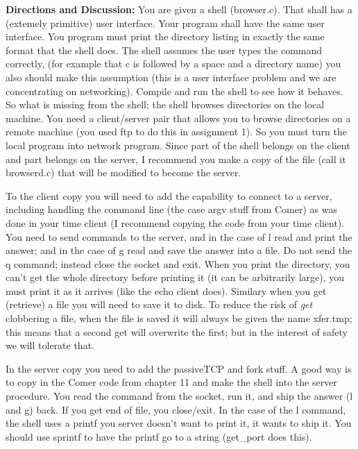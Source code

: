 {\bf Directions and Discussion:} 
You are given a shell ({\ltt{}browser.c}). 
That shall has a (extemely primitive) user interface.
Your program shall have the same user interface.
You program must print the directory listing in exactly the same
format that the shell does.
The shell assumes the user types the command correctly,
(for example that c is followed by a space and a directory name)
you also should make this assumption
(this is a user interface problem and we are concentrating on networking).
Compile and run the shell to see how it behaves.
So what is missing from the shell;
the shell browses directories on the local machine.
You need a client/server pair that allows you to browse directories on
a remote machine (you used ftp to do this in assignment 1).
So you must turn the local program into network program.
Since part of the shell belongs on the client and part belongs
on the server, I recommend you make a copy of the file
(call it {\ltt{}browserd.c}) that will be modified to become the server.

To the client copy you will need to add the 
capability to connect to a server, 
including handling the command line (the case argv stuff from Comer)
as was done in your time client
(I recommend copying the code from your time client).
You need to send commands to the server,
and in the case of {\ltt{}l} read and print the answer;
and in the case of {\ltt{}g} read and save the answer into a file.
Do not send the {\ltt{}q} command; instead close the socket and exit.
When you print the directory, you can't get the whole directory before 
printing it (it can be arbitrarily large), 
you must print it as it arrives (like the echo client does).
Similary when you get (retrieve) a file you will need to save it to disk.
To reduce the risk of {\it get} clobbering a file, when the file is
saved it will always be given the name {\ltt{}xfer.tmp}; this means
that a second get will overwrite the first; but in the interest of
safety we will tolerate that.

In the server copy you need to add the passiveTCP and fork stuff.
A good way is to copy in the Comer code from chapter 11 and make the shell 
into the server procedure.
You read the command from the socket,
run it, and ship the answer ({\ltt{}l} and {\ltt{}g}) back.
If you get end of file, you close/exit.
In the case of the {\ltt{}l} command, the shell uses a {\ltt{}printf}
you server doesn't want to print it, it wants to ship it.
You should use {\ltt{}sprintf} to have the {\ltt{}printf} go to a string
({\ltt{}get_port} does this).

